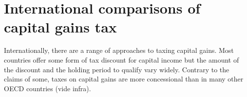 \documentclass{grattan}\usepackage[]{graphicx}\usepackage[]{color}
\begin{document}
\onecolumn
\chapter{International comparisons of capital gains tax}
Internationally, there are a range of approaches to taxing capital gains. Most countries offer some form of tax discount for capital income but the amount of the discount and the holding period to qualify vary widely. Contrary to the claims of some, taxes on capital gains are more concessional than in many other OECD countries (vide infra).

\newcommand{\cella}[1]{{\cellcolor{Color2}\makecell[tr]{#1}}}
\newcommand{\cellb}[1]{{\cellcolor{Color3}\makecell[tr]{#1}}}
\newcommand{\cellc}[1]{\cellcolor{Color4}\makecell[tr]{#1}}
\newcommand{\celld}[1]{\cellcolor{Color5}\makecell[tr]{#1}}
\end{document}
